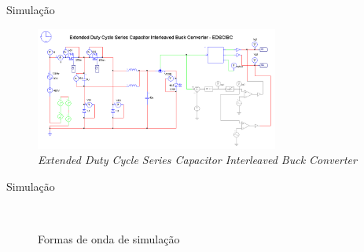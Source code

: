 \documentclass{beamer}
\begin{document}
\begin{frame}{Simulação}
	
	\begin{figure}[htb]
		\centering
		\includegraphics[width=8cm]{../../ESQUEMAS/ctrl_egibc_2.png}
		\caption{\textit{Extended Duty Cycle Series Capacitor Interleaved Buck Converter}}
	\end{figure}
	
\end{frame}
\begin{frame}{Simulação}
	\begin{figure}[htb]
		\centering
		\mbox{
			\qquad
		}
		\caption{Formas de onda de simulação}
	\end{figure}
\end{frame}
\end{document}

